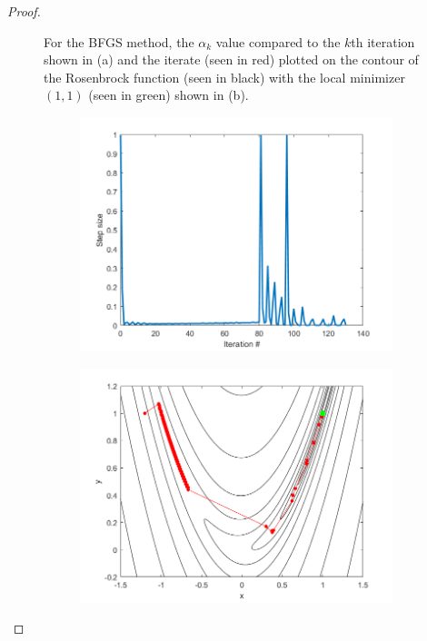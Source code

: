 \documentclass[12pt]{report}
\begin{document}
\begin{problem}
\begin{proof}
\begin{figure}[H]
\begin{subfigure}[b]{0.5\linewidth}
            \caption{}
            \label{fig4-3:b}
            \vspace{4ex}
        \end{subfigure}
        \caption{For the BFGS method, the $\alpha_k$ value compared to the $k$th iteration shown in (a) and the iterate (seen in red) plotted on the contour of the Rosenbrock function (seen in black) with the local minimizer $(1,1)$ (seen in green) shown in (b).}
        \label{fig4-3}
    \end{figure}
    \begin{figure}[H]
        \begin{subfigure}[b]{0.5\linewidth}
            \centering
            \includegraphics[width=\linewidth]{images/4-4-alpha.png}
            \caption{}
            \label{fig4-4:a}
            \vspace{4ex}
        \end{subfigure}%
        \begin{subfigure}[b]{0.5\linewidth}
            \centering
            \includegraphics[width=\linewidth]{images/4-4-contour.png}

\end{subfigure}
\end{figure}
\end{proof}
\end{problem}
\end{document}

